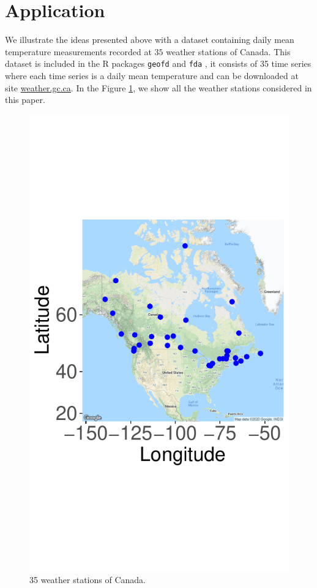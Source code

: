 \documentclass[12pt]{interact}
\theoremstyle{plain}%
\theoremstyle{definition}
\theoremstyle{remark}
\begin{document}
\section{Application}\label{sec:application}

We illustrate the ideas presented above with a dataset containing daily mean temperature measurements recorded at \(35\) weather stations of Canada. This dataset is included in the R packages \texttt{geofd} \citep{ramsay2018} and \texttt{fda} \citep{giraldo2012geofd}, it consists of 35 time series where each time series is a daily mean temperature and can be downloaded at site \href{https://weather.gc.ca/}{weather.gc.ca}. In the Figure \ref{fig:weather-stations}, we show all the weather stations
considered in this paper.
\begin{figure}[htbp]
	\centering
	\includegraphics[width=0.55\linewidth]{figure/mapStationsCanada} 
	\caption{35 weather stations  of Canada.}
	\label{fig:weather-stations}
\end{figure}
\end{document}
